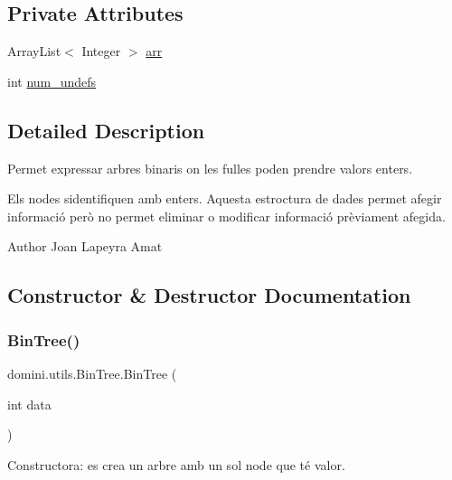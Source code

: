 \subsection*{Private Attributes}
\begin{DoxyCompactItemize}
\item 
Array\+List$<$ Integer $>$ \hyperlink{classdomini_1_1utils_1_1BinTree_a357bcbcf07ba7fcb99d11b237d189e65}{arr}
\item 
int \hyperlink{classdomini_1_1utils_1_1BinTree_a36f1212262c353accbc0a0385fa45a8d}{num\+\_\+undefs}
\end{DoxyCompactItemize}


\subsection{Detailed Description}
Permet expressar arbres binaris on les fulles poden prendre valors enters. 

Els nodes s\textquotesingle{}identifiquen amb enters. Aquesta estroctura de dades permet afegir informació però no permet eliminar o modificar informació prèviament afegida.

\begin{DoxyAuthor}{Author}
Joan Lapeyra Amat 
\end{DoxyAuthor}


\subsection{Constructor \& Destructor Documentation}
\mbox{\label{classdomini_1_1utils_1_1BinTree_a83904c6ebf931ba29a134be5f29a66c7}} 
\subsubsection{\texorpdfstring{Bin\+Tree()}{BinTree()}}
{\footnotesize\ttfamily domini.\+utils.\+Bin\+Tree.\+Bin\+Tree (\begin{DoxyParamCaption}\item[{int}]{data }\end{DoxyParamCaption})\hspace{0.3cm}{\ttfamily [inline]}}



Constructora\+: es crea un arbre amb un sol node que té valor. 



